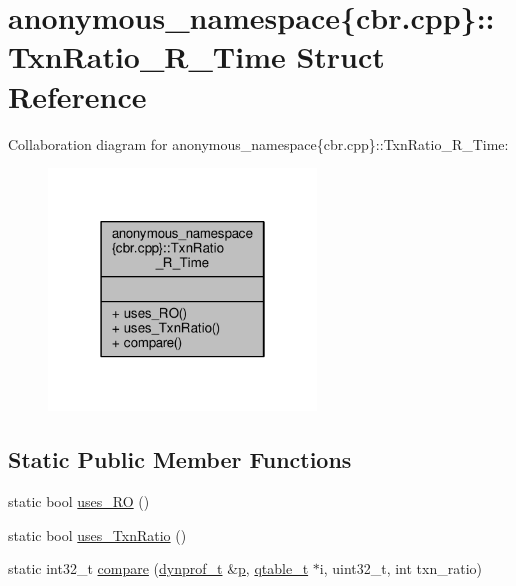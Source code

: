 \hypertarget{structanonymous__namespace_02cbr_8cpp_03_1_1TxnRatio__R__Time}{\section{anonymous\-\_\-namespace\{cbr.\-cpp\}\-:\-:Txn\-Ratio\-\_\-\-R\-\_\-\-Time Struct Reference}
\label{structanonymous__namespace_02cbr_8cpp_03_1_1TxnRatio__R__Time}
}


Collaboration diagram for anonymous\-\_\-namespace\{cbr.\-cpp\}\-:\-:Txn\-Ratio\-\_\-\-R\-\_\-\-Time\-:
\nopagebreak
\begin{figure}[H]
\begin{center}
\leavevmode
\includegraphics[width=202pt]{structanonymous__namespace_02cbr_8cpp_03_1_1TxnRatio__R__Time__coll__graph}
\end{center}
\end{figure}
\subsection*{Static Public Member Functions}
\begin{DoxyCompactItemize}
\item 
static bool \hyperlink{structanonymous__namespace_02cbr_8cpp_03_1_1TxnRatio__R__Time_a2d75f343835468b50fb969e47035f054}{uses\-\_\-\-R\-O} ()
\item 
static bool \hyperlink{structanonymous__namespace_02cbr_8cpp_03_1_1TxnRatio__R__Time_af572680da6d7c3f57d9cac1ebaaebe79}{uses\-\_\-\-Txn\-Ratio} ()
\item 
static int32\-\_\-t \hyperlink{structanonymous__namespace_02cbr_8cpp_03_1_1TxnRatio__R__Time_aa090ad6f9586e0896a24371a274f57d0}{compare} (\hyperlink{structstm_1_1dynprof__t}{dynprof\-\_\-t} \&\hyperlink{counted__ptr_8hpp_a5c9f59d7c24e3fd6ceae319a968fc3e0}{p}, \hyperlink{structstm_1_1qtable__t}{qtable\-\_\-t} $\ast$i, uint32\-\_\-t, int txn\-\_\-ratio)
\end{DoxyCompactItemize}


